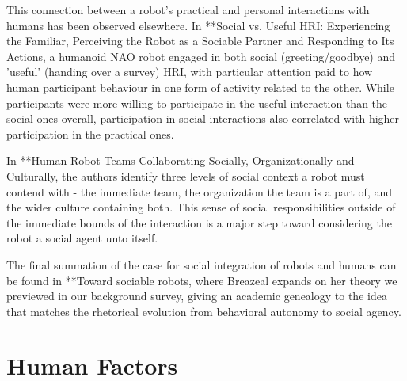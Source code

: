 \documentclass{sfuthesis}
\begin{document}
This connection between a robot's practical and personal interactions with humans has been observed elsewhere. In **Social vs. Useful HRI: Experiencing the Familiar, Perceiving the Robot as a Sociable Partner and Responding to Its Actions, a humanoid NAO robot engaged in both social (greeting/goodbye) and 'useful' (handing over a survey) HRI, with particular attention paid to how human participant behaviour in one form of activity related to the other. While participants were more willing to participate in the useful interaction than the social ones overall, participation in social interactions also correlated with higher participation in the practical ones.

In **Human-Robot Teams Collaborating Socially, Organizationally and Culturally, the authors identify three levels of social context a robot must contend with - the immediate team, the organization the team is a part of, and the wider culture containing both. This sense of social responsibilities outside of the immediate bounds of the interaction is a major step toward considering the robot a social agent unto itself.

The final summation of the case for social integration of robots and humans can be found in **Toward sociable robots, where Breazeal expands on her theory we previewed in our background survey, giving an academic genealogy to the idea that matches the rhetorical evolution from behavioral autonomy to social agency.














\section{Human Factors}
\end{document}
